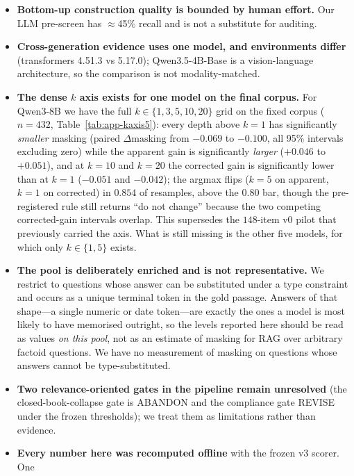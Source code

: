 \documentclass[11pt]{article}
\newcommand{\mask}{\ensuremath{\mathrm{masking}}}
\begin{document}
\begin{itemize}
(\S\ref{sec:validity}). Two caveats bound the rate itself: the verifier was run on the pre-fix
pool, so the fixed corpus is scored by transferring its flags rather than by a fresh pass, and
the recall figure rests on the $22$ human-judged items it found.
\item \textbf{Bottom-up construction quality is bounded by human effort.} Our LLM
pre-screen has $\approx$45\% recall and is not a substitute for auditing.
\item \textbf{Cross-generation evidence uses one model, and environments differ}
(transformers 4.51.3 vs 5.17.0); Qwen3.5-4B-Base is a vision-language architecture, so the
comparison is not modality-matched.
\item \textbf{The dense $k$ axis exists for one model on the final corpus.} For Qwen3-8B we have
the full $k\in\{1,3,5,10,20\}$ grid on the fixed corpus ($n{=}432$,
Table~\ref{tab:app-kaxis5}): every depth above $k{=}1$ has significantly \emph{smaller} masking
(paired $\Delta\mask$ from $-0.069$ to $-0.100$, all 95\% intervals excluding zero) while the
apparent gain is significantly \emph{larger} ($+0.046$ to $+0.051$), and at $k{=}10$ and $k{=}20$
the corrected gain is significantly lower than at $k{=}1$ ($-0.051$ and $-0.042$); the argmax
flips ($k{=}5$ on apparent, $k{=}1$ on corrected) in $0.854$ of resamples, above the $0.80$ bar,
though the pre-registered rule still returns ``do not change'' because the two competing
corrected-gain intervals overlap. This supersedes the $148$-item v0 pilot that previously
carried the axis. What is still missing is the other five models, for which only
$k\in\{1,5\}$ exists.
\item \textbf{The pool is deliberately enriched and is not representative.} We restrict
to questions whose answer can be substituted under a type constraint and occurs as a
unique terminal token in the gold passage. Answers of that shape---a single numeric or
date token---are exactly the ones a model is most likely to have memorised outright, so the
levels reported here should be read as values \emph{on this pool}, not as an estimate of
masking for {RAG} over arbitrary factoid questions. We have no measurement of masking on
questions whose answers cannot be type-substituted.
\item \textbf{Two relevance-oriented gates in the pipeline remain unresolved}
(the closed-book-collapse gate is ABANDON and the compliance gate REVISE under the frozen
thresholds); we treat them as limitations rather than evidence.
\item \textbf{Every number here was recomputed offline} with the frozen v3 scorer. One

\end{itemize}
\end{document}
